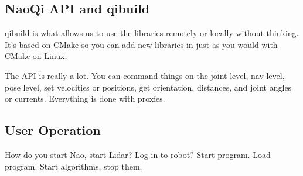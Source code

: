 \subsection{NaoQi API and qibuild}
qibuild is what allows us to use the libraries remotely or locally without thinking. It's based on CMake
so you can add new libraries in just as you would with CMake on Linux.

The API is really a lot. You can command things on the joint level, nav level, pose level,
set velocities or positions, get orientation, distances, and joint angles or currents.
Everything is done with proxies.

\subsection{User Operation}
How do you start Nao, start Lidar? Log in to robot? Start program. Load program.
Start algorithms, stop them.
